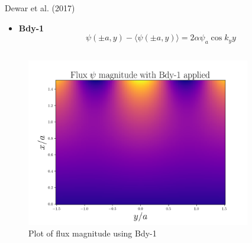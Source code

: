 \documentclass[compress]{beamer}
\begin{document}
\begin{frame}{Dewar et al. (2017) \cite{dewar2017}}
    \begin{itemize}
        \item {\bf Bdy-1}
        \[
            \psi\left( \pm a, y \right) - \langle \psi\left( \pm a, y \right) \rangle = 2\alpha \psi_a \cos{k_y y}
        \]
    \end{itemize}
    \vspace{-1.4em}
    \begin{columns}
        \begin{column}{0.5\textwidth}
            \begin{figure}[htpb]
                \centering
                \includegraphics[scale=0.3]{media/bdy-1_general-solution.png}
                \caption{Plot of flux magnitude using Bdy-1}
            \end{figure}
       \end{column} 
       \begin{column}{0.5\textwidth}
            \begin{figure}[htpb]
                \centering

\end{figure}
\end{column}
\end{columns}
\end{frame}
\end{document}
